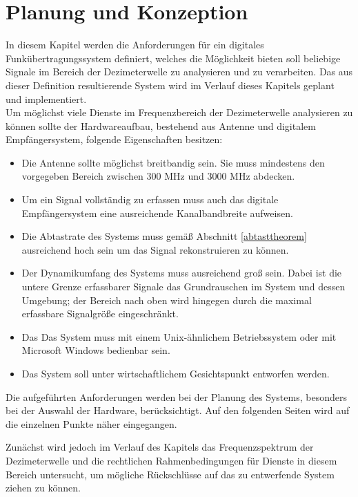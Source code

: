 \chapter{Planung und Konzeption}
In diesem Kapitel werden die Anforderungen für ein digitales Funkübertragungssystem definiert, welches die Möglichkeit bieten soll beliebige Signale im Bereich der Dezimeterwelle zu analysieren und zu verarbeiten. Das aus dieser Definition resultierende System wird im Verlauf dieses Kapitels geplant und implementiert.\\
Um möglichst viele Dienste im Frequenzbereich der Dezimeterwelle analysieren zu können sollte der Hardwareaufbau, bestehend aus Antenne und digitalem Empfängersystem, folgende Eigenschaften besitzen:
\begin{itemize}
	\item Die Antenne sollte möglichst breitbandig sein. Sie muss mindestens den vorgegeben Bereich zwischen 300 MHz und 3000 MHz abdecken.
	\item Um ein Signal vollständig zu erfassen muss auch das digitale Empfängersystem eine ausreichende Kanalbandbreite aufweisen.
	\item Die Abtastrate des Systems muss gemäß Abschnitt \ref{abtasttheorem} ausreichend hoch sein um das Signal rekonstruieren zu können.
	\item Der Dynamikumfang des Systems muss ausreichend groß sein. Dabei ist die untere Grenze erfassbarer Signale das Grundrauschen im System und dessen Umgebung; der Bereich nach oben wird hingegen durch die maximal erfassbare Signalgröße eingeschränkt. %
	\item Das Das System muss mit einem Unix-ähnlichem Betriebssystem oder mit Microsoft Windows bedienbar sein.
	\item Das System soll unter wirtschaftlichem Gesichtspunkt entworfen werden.
\end{itemize}%

Die aufgeführten Anforderungen werden bei der Planung des Systems, besonders bei der Auswahl der Hardware, berücksichtigt. Auf den folgenden Seiten wird auf die einzelnen Punkte näher eingegangen. 

Zunächst wird jedoch im Verlauf des Kapitels das Frequenzspektrum der Dezimeterwelle und die rechtlichen Rahmenbedingungen für Dienste in diesem Bereich untersucht, um mögliche Rückschlüsse auf das zu entwerfende System ziehen zu können.



